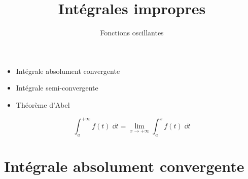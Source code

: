 







\title{{\bf Intégrales impropres}}
\subtitle{Fonctions oscillantes}

\begin{frame}
  
  \debutmontitre

  \pause

{\footnotesize
\hfill
{}
\begin{minipage}{0.6\textwidth}
  \begin{itemize}
    \item<3-> Intégrale absolument convergente
    \item<4-> Intégrale semi-convergente
    \item<5-> Théorème d'Abel
      \end{itemize}
\end{minipage}
}

\end{frame}

\setcounter{framenumber}{0}

\begin{frame}

\pause

$$\int_a^{+\infty} f(t)\;\dd t = \lim_{x\rightarrow +\infty} \int_a^x f(t)\;\dd t$$

\end{frame}

\section*{Intégrale absolument convergente}

